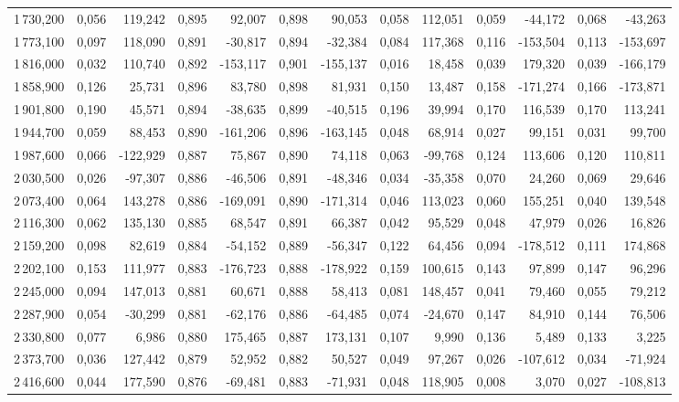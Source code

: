 \begin{longtable}{rrrrrrrrrrrrr}
1\,730,200 & 0,056 & 119,242 & 0,895 & 92,007 & 0,898 & 90,053 & 0,058 & 112,051 & 0,059 & -44,172 & 0,068 & -43,263\\
1\,773,100 & 0,097 & 118,090 & 0,891 & -30,817 & 0,894 & -32,384 & 0,084 & 117,368 & 0,116 & -153,504 & 0,113 & -153,697\\
1\,816,000 & 0,032 & 110,740 & 0,892 & -153,117 & 0,901 & -155,137 & 0,016 & 18,458 & 0,039 & 179,320 & 0,039 & -166,179\\
1\,858,900 & 0,126 & 25,731 & 0,896 & 83,780 & 0,898 & 81,931 & 0,150 & 13,487 & 0,158 & -171,274 & 0,166 & -173,871\\
1\,901,800 & 0,190 & 45,571 & 0,894 & -38,635 & 0,899 & -40,515 & 0,196 & 39,994 & 0,170 & 116,539 & 0,170 & 113,241\\
1\,944,700 & 0,059 & 88,453 & 0,890 & -161,206 & 0,896 & -163,145 & 0,048 & 68,914 & 0,027 & 99,151 & 0,031 & 99,700\\
1\,987,600 & 0,066 & -122,929 & 0,887 & 75,867 & 0,890 & 74,118 & 0,063 & -99,768 & 0,124 & 113,606 & 0,120 & 110,811\\
2\,030,500 & 0,026 & -97,307 & 0,886 & -46,506 & 0,891 & -48,346 & 0,034 & -35,358 & 0,070 & 24,260 & 0,069 & 29,646\\
2\,073,400 & 0,064 & 143,278 & 0,886 & -169,091 & 0,890 & -171,314 & 0,046 & 113,023 & 0,060 & 155,251 & 0,040 & 139,548\\
2\,116,300 & 0,062 & 135,130 & 0,885 & 68,547 & 0,891 & 66,387 & 0,042 & 95,529 & 0,048 & 47,979 & 0,026 & 16,826\\
2\,159,200 & 0,098 & 82,619 & 0,884 & -54,152 & 0,889 & -56,347 & 0,122 & 64,456 & 0,094 & -178,512 & 0,111 & 174,868\\
2\,202,100 & 0,153 & 111,977 & 0,883 & -176,723 & 0,888 & -178,922 & 0,159 & 100,615 & 0,143 & 97,899 & 0,147 & 96,296\\
2\,245,000 & 0,094 & 147,013 & 0,881 & 60,671 & 0,888 & 58,413 & 0,081 & 148,457 & 0,041 & 79,460 & 0,055 & 79,212\\
2\,287,900 & 0,054 & -30,299 & 0,881 & -62,176 & 0,886 & -64,485 & 0,074 & -24,670 & 0,147 & 84,910 & 0,144 & 76,506\\
2\,330,800 & 0,077 & 6,986 & 0,880 & 175,465 & 0,887 & 173,131 & 0,107 & 9,990 & 0,136 & 5,489 & 0,133 & 3,225\\
2\,373,700 & 0,036 & 127,442 & 0,879 & 52,952 & 0,882 & 50,527 & 0,049 & 97,267 & 0,026 & -107,612 & 0,034 & -71,924\\
2\,416,600 & 0,044 & 177,590 & 0,876 & -69,481 & 0,883 & -71,931 & 0,048 & 118,905 & 0,008 & 3,070 & 0,027 & -108,813\\

\end{longtable}
